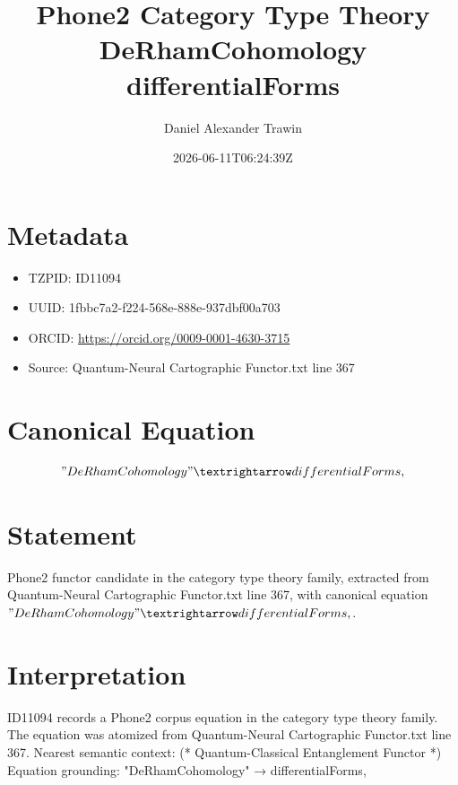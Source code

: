 \documentclass[11pt]{article}
\title{Phone2 Category Type Theory DeRhamCohomology differentialForms}
\author{Daniel Alexander Trawin}
\date{2026-06-11T06:24:39Z}
\begin{document}
\maketitle
\section*{Metadata}
\begin{itemize}
\item TZPID: ID11094
\item UUID: 1fbbc7a2-f224-568e-888e-937dbf00a703
\item ORCID: \url{https://orcid.org/0009-0001-4630-3715}
\item Source: Quantum-Neural Cartographic Functor.txt line 367
\end{itemize}
\section*{Canonical Equation}
\[
"DeRhamCohomology" → differentialForms,
\]
\section*{Statement}
Phone2 functor candidate in the category type theory family, extracted from Quantum-Neural Cartographic Functor.txt line 367, with canonical equation $"DeRhamCohomology" → differentialForms,$.
\section*{Interpretation}
ID11094 records a Phone2 corpus equation in the category type theory family. The equation was atomized from Quantum-Neural Cartographic Functor.txt line 367. Nearest semantic context: (* Quantum-Classical Entanglement Functor *) Equation grounding: "DeRhamCohomology" → differentialForms,
\end{document}
